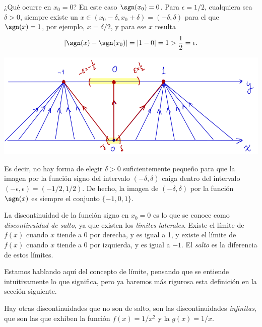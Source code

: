 ¿Qué ocurre en $x_0=0$?
En este caso $\sgn(x_0)=0$.
Para $\epsilon = 1/2$, cualquiera sea $\delta>0$, siempre existe un $x\in (x_0-\delta,x_0+\delta)=(-\delta,\delta)$ para el que $\sgn(x)=1$, por ejemplo, $x=\delta/2$, y para ese $x$ resulta
\[
|\sgn(x)-\sgn(x_0)| = |1 - 0| = 1 > \frac12=\epsilon.
\]

\centerline{\includegraphics[width=.8\textwidth]{pics/signo-discontinuo.png}}

Es decir, no hay forma de elegir $\delta>0$ suficientemente pequeño para que la imagen por la función signo del intervalo $(-\delta,\delta)$ caiga dentro del intervalo $(-\epsilon,\epsilon)=(-1/2,1/2)$. De hecho, la imagen de $(-\delta,\delta)$ por la función $\sgn(x)$ es siempre el conjunto $\{-1,0,1\}$.

La discontinuidad de la función signo en $x_0=0$ es lo que se conoce como \emph{discontinuidad de salto}, ya que existen los \emph{límites laterales}.
Existe el límite de $f(x)$ cuando $x$ tiende a $0$ por derecha, y es igual a 1, y existe el límite de $f(x)$ cuando $x$ tiende a $0$ por izquierda, y es igual a $-1$. El \emph{salto} es la diferencia de estos límites.

Estamos hablando aquí del concepto de límite, pensando que se entiende intuitivamente lo que significa, pero ya haremos más rigurosa esta definición en la sección siguiente.

Hay otras discontinuidades que no son de salto, son las discontinuidades \emph{infinitas}, que son las que exhiben la función $f(x)=1/x^2$ y la $g(x)=1/x$.

